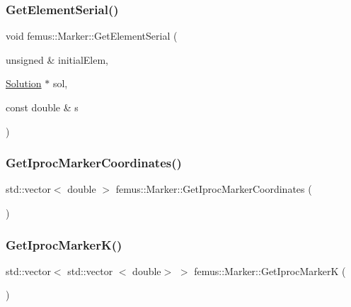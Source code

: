 \subsubsection{\texorpdfstring{Get\+Element\+Serial()}{GetElementSerial()}}
{\footnotesize\ttfamily void femus\+::\+Marker\+::\+Get\+Element\+Serial (\begin{DoxyParamCaption}\item[{unsigned \&}]{initial\+Elem,  }\item[{\mbox{\hyperlink{classfemus_1_1_solution}{Solution}} $\ast$}]{sol,  }\item[{const double \&}]{s }\end{DoxyParamCaption})}

\mbox{\label{classfemus_1_1_marker_a35c7e087d935de1e4088317bc7a8470c}} 
\subsubsection{\texorpdfstring{Get\+Iproc\+Marker\+Coordinates()}{GetIprocMarkerCoordinates()}}
{\footnotesize\ttfamily std\+::vector$<$ double $>$ femus\+::\+Marker\+::\+Get\+Iproc\+Marker\+Coordinates (\begin{DoxyParamCaption}{ }\end{DoxyParamCaption})\hspace{0.3cm}{\ttfamily [inline]}}

\mbox{\label{classfemus_1_1_marker_a2480e8c69f57128c315e92f5fee37fd2}} 
\subsubsection{\texorpdfstring{Get\+Iproc\+Marker\+K()}{GetIprocMarkerK()}}
{\footnotesize\ttfamily std\+::vector$<$ std\+::vector $<$ double$>$ $>$ femus\+::\+Marker\+::\+Get\+Iproc\+MarkerK (\begin{DoxyParamCaption}{ }\end{DoxyParamCaption})\hspace{0.3cm}{\ttfamily [inline]}}

